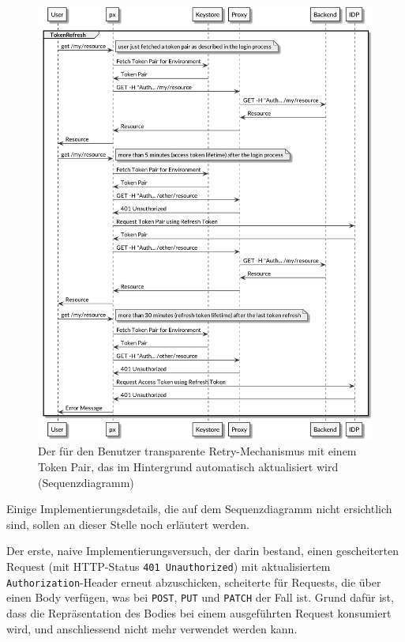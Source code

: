 \begin{figure}
    \centering
    \includegraphics[width=\linewidth]{pics/sequence-retry.png}
    \caption{Der für den Benutzer transparente Retry-Mechanismus mit einem Token Pair, das im Hintergrund automatisch aktualisiert wird (Sequenzdiagramm)}
    \label{fig:retry-mechanism}
\end{figure}

Einige Implementierungsdetails, die auf dem Sequenzdiagramm nicht ersichtlich sind, sollen an dieser Stelle noch erläutert werden.

Der erste, naive Implementierungsversuch, der darin bestand, einen gescheiterten Request (mit HTTP-Status \texttt{401 Unauthorized}) mit aktualisiertem \texttt{Authorization}-Header erneut abzuschicken, scheiterte für Requests, die über einen Body verfügen, was bei \texttt{POST}, \texttt{PUT} und \texttt{PATCH} der Fall ist. Grund dafür ist, dass die Repräsentation des Bodies bei einem ausgeführten Request konsumiert wird, und anschliessend nicht mehr verwendet werden kann.

